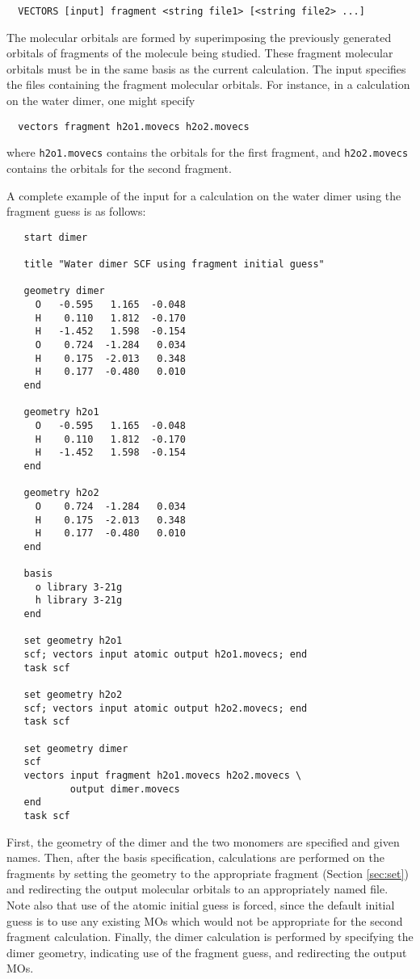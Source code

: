 \begin{verbatim}
  VECTORS [input] fragment <string file1> [<string file2> ...]
\end{verbatim}
The molecular orbitals are formed by superimposing the previously
generated orbitals of fragments of the molecule being studied.  These
fragment molecular orbitals must be in the same basis as the current
calculation.  The input specifies the files containing the fragment
molecular orbitals.  For instance, in a calculation on the water
dimer, one might specify
\begin{verbatim}
  vectors fragment h2o1.movecs h2o2.movecs
\end{verbatim}
where \verb+h2o1.movecs+ contains the orbitals for the first fragment, and
\verb+h2o2.movecs+ contains the orbitals for the second fragment.

A complete example of the input for a calculation on the water
dimer using the fragment guess is as follows:
\begin{verbatim}
   start dimer

   title "Water dimer SCF using fragment initial guess"

   geometry dimer
     O   -0.595   1.165  -0.048
     H    0.110   1.812  -0.170
     H   -1.452   1.598  -0.154
     O    0.724  -1.284   0.034
     H    0.175  -2.013   0.348
     H    0.177  -0.480   0.010
   end

   geometry h2o1
     O   -0.595   1.165  -0.048
     H    0.110   1.812  -0.170
     H   -1.452   1.598  -0.154
   end

   geometry h2o2
     O    0.724  -1.284   0.034
     H    0.175  -2.013   0.348
     H    0.177  -0.480   0.010
   end

   basis
     o library 3-21g
     h library 3-21g
   end

   set geometry h2o1
   scf; vectors input atomic output h2o1.movecs; end
   task scf

   set geometry h2o2
   scf; vectors input atomic output h2o2.movecs; end
   task scf

   set geometry dimer
   scf
   vectors input fragment h2o1.movecs h2o2.movecs \
           output dimer.movecs
   end
   task scf
\end{verbatim}
First, the geometry of the dimer and the two monomers are specified
and given names.  Then, after the basis specification, calculations
are performed on the fragments by setting the geometry to the
appropriate fragment (Section \ref{sec:set}) and redirecting the
output molecular orbitals to an appropriately named file.  Note also
that use of the atomic initial guess is forced, since the default
initial guess is to use any existing MOs which would not be
appropriate for the second fragment calculation.  Finally, the dimer
calculation is performed by specifying the dimer geometry, indicating
use of the fragment guess, and redirecting the output MOs.


